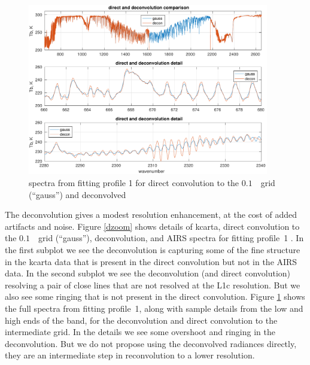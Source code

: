 \documentclass[11pt]{article}
\begin{document}
\begin{figure} %
  \centering
  \includegraphics[height=7.5cm]{figures/airs_decon_spec.pdf}
  \caption{spectra from fitting profile 1 for direct convolution to
    the $0.1$~\wn\ grid (``gauss'') and deconvolved {\airs}}
  \label{dspec}
\end{figure}


The {\airs} deconvolution gives a modest resolution enhancement, at
the cost of added artifacts and noise.  Figure \ref{dzoom} shows
details of kcarta, direct convolution to the $0.1$~\wn\ grid
(``gauss''), deconvolution, and AIRS spectra for fitting profile~1
\cite{sarta1,sarta2}.  In the first subplot we see the deconvolution
is capturing some of the fine structure in the kcarta data that is
present in the direct convolution but not in the AIRS data.  In the
second subplot we see the deconvolution (and direct convolution)
resolving a pair of close lines that are not resolved at the {\airs}
L1c resolution.  But we also see some ringing that is not present in
the direct convolution.  Figure \ref{dspec} shows the full spectra
from fitting profile~1, along with sample details from the low and
high ends of the band, for the deconvolution and direct convolution
to the intermediate grid.  In the details we see some overshoot and
ringing in the deconvolution.  But we do not propose using the
deconvolved radiances directly, they are an intermediate step in
reconvolution to a lower resolution.
\end{document}
